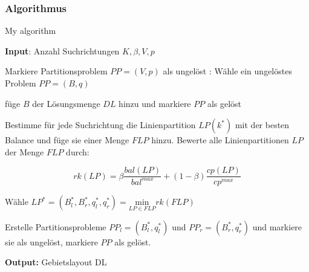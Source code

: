 
        \subsubsection{Algorithmus} %
        \label{ssub:algorithmus}

          \begin{algorithm}
            \caption{My algorithm}\label{euclid}
            \textbf{Input}: Anzahl Suchrichtungen $K, \beta, V, p$
            \begin{algorithmic}[1]
              \State Markiere Partitionsproblem $PP = (V, p)$ als ungelöst
              :
                \State Wähle ein ungelöstes Problem $PP = (B, q)$
                
                  \State füge $B$ der Lösungsmenge $DL$ hinzu und markiere $PP$ als gelöst
                \EndIf

                  \State Bestimme für jede Suchrichtung die Linienpartition $LP(k^*)$ mit der besten Balance und füge sie einer Menge $FLP$ hinzu.
                  \State Bewerte alle Linienpartitionen $LP$ der Menge $FLP$ durch:
                  
                    \begin{equation*}
                      rk(LP) = \beta\frac{bal(LP)}{bal^{max}} + (1 - \beta)\frac{cp(LP)}{cp^{max}}
                    \end{equation*}

                  \State Wähle $LP^{*} = (B_{l}^{*}, B_{r}^{*}, q_{l}^{*}, q_{r}^{*}) = \underset{LP \in FLP}{\text{min}}rk(FLP)$ 

                  \State Erstelle Partitionsprobleme $PP_l = (B_{l}^{*}, q_{l}^{*})$ und $PP_r = (B_{r}^{*}, q_{r}^{*})$ und markiere sie als ungelöst, markiere $PP$ als gelöst.
                \EndIf
              \EndWhile
            \end{algorithmic}
            \textbf{Output:} Gebietslayout DL
          \end{algorithm}


        
            
           
    

